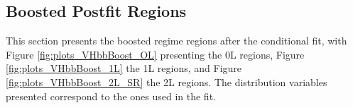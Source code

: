 \subsection{Boosted Postfit Regions}\label{appsec-vh-analRegBooPosfit}
This section presents the boosted regime regions after the conditional fit, with Figure \ref{fig:plots_VHbbBoost_OL} presenting the 0L regions, Figure \ref{fig:plots_VHbbBoost_1L} the 1L regions, and Figure \ref{fig:plots_VHbbBoost_2L_SR} the 2L regions. The distribution variables presented correspond to the ones used in the fit.

\clearpage

\clearpage 

\clearpage
